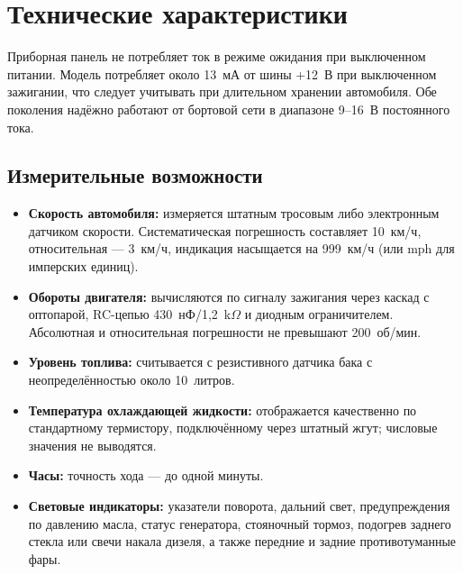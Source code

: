 \chapter{Технические характеристики}\label{ch:technical-specs-ru}

Приборная панель \ReplicaGenOne{} не потребляет ток в режиме ожидания при выключенном питании.
Модель \ReplicaNextShort{} потребляет около 13~мА от шины +12~В при выключенном зажигании, что следует учитывать при длительном хранении автомобиля.
Обе поколения надёжно работают от бортовой сети в диапазоне 9--16~В постоянного тока.

\section{Измерительные возможности}
\begin{itemize}
    \item \textbf{Скорость автомобиля:} измеряется штатным тросовым либо электронным датчиком скорости.
    Систематическая погрешность составляет 10~км/ч, относительная — 3~км/ч, индикация насыщается на 999~км/ч (или mph для имперских единиц).
    \item \textbf{Обороты двигателя:} вычисляются по сигналу зажигания через каскад с оптопарой, RC-цепью 430~нФ/1{,}2~k\ensuremath{\Omega} и диодным ограничителем.
    Абсолютная и относительная погрешности не превышают 200~об/мин.
    \item \textbf{Уровень топлива:} считывается с резистивного датчика бака с неопределённостью около 10~литров.
    \item \textbf{Температура охлаждающей жидкости:} отображается качественно по стандартному термистору, подключённому через штатный жгут; числовые значения не выводятся.
    \item \textbf{Часы:} точность хода — до одной минуты.
    \item \textbf{Световые индикаторы:} указатели поворота, дальний свет, предупреждения по давлению масла, статус генератора, стояночный тормоз, подогрев заднего стекла или свечи накала дизеля, а также передние и задние противотуманные фары.
\end{itemize}
